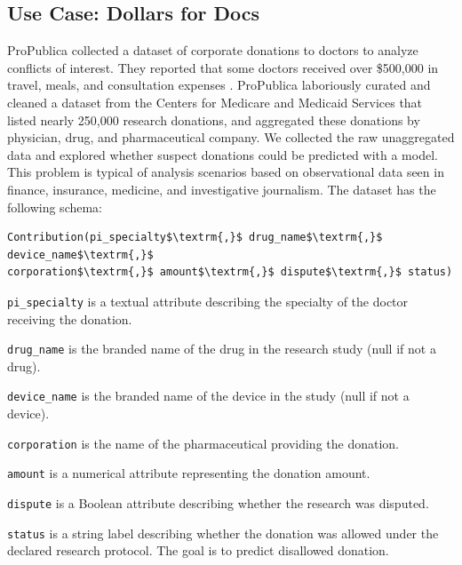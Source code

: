 \subsection{Use Case: Dollars for Docs \cite{dollarsfordocs}}\label{s:usecase}
ProPublica collected a dataset of corporate donations to doctors to analyze conflicts of interest. 
They reported that some doctors received over \$500,000 in travel, meals, and consultation expenses \cite{dollarsfordocsa}.
ProPublica laboriously curated and cleaned a dataset from the Centers for Medicare and Medicaid Services that listed nearly 250,000 research donations, and aggregated these donations by physician, drug, and pharmaceutical company.
We collected the raw unaggregated data and explored whether suspect donations could be predicted with a model.
This problem is typical of analysis scenarios based on observational data seen in finance, insurance, medicine, and investigative journalism.
The dataset has the following schema:
\begin{lstlisting}[mathescape,basicstyle={\scriptsize}]
Contribution(pi_specialty$\textrm{,}$ drug_name$\textrm{,}$ device_name$\textrm{,}$
corporation$\textrm{,}$ amount$\textrm{,}$ dispute$\textrm{,}$ status)
\end{lstlisting}

\noindent\texttt{pi\_specialty} is a textual attribute describing the specialty of the doctor receiving the donation.

\noindent\texttt{drug\_name} is the branded name of the drug in the research study (null if not a drug).

\noindent\texttt{device\_name} is the branded name of the device in the study (null if not a device).

\noindent\texttt{corporation} is the name of the pharmaceutical providing the donation.

\noindent\texttt{amount} is a numerical attribute representing the donation amount.

\noindent\texttt{dispute} is a Boolean attribute describing whether the research was disputed.

\noindent\texttt{status} is a string label describing whether the  donation was allowed under the declared research protocol. The goal is to predict disallowed  donation. 

\vspace{0.5em}

